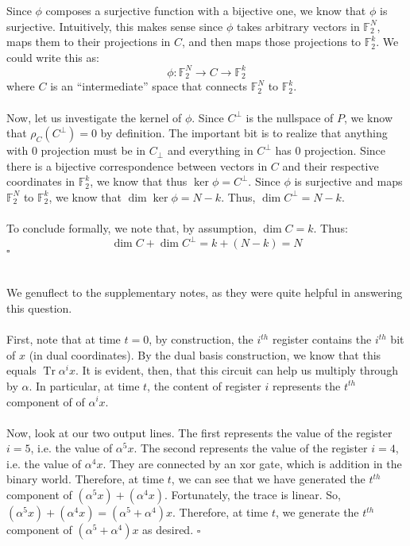 \documentclass[letterpaper]{article}
\newcommand*{\QED}{\hfill\ensuremath{\square}}%
\DeclareMathOperator{\tr}{Tr}
\begin{document}
Since $ \phi $ composes a surjective function with a bijective one, we know that $ \phi $ is surjective.
Intuitively, this makes sense since $ \phi $ takes arbitrary vectors in $ \mathbb{F}_2^N $, maps them to their projections in $ C $, and then maps those projections to $ \mathbb{F}_2^k $.
We could write this as:
\[
\phi : \mathbb{F}_2^N \to C \to \mathbb{F}_2^k
\]
where $ C $ is an ``intermediate'' space that connects $ \mathbb{F}_2^N $ to $ \mathbb{F}_2^k $.
\\ \\
Now, let us investigate the kernel of $ \phi $.
Since $ C^{\perp} $ is the nullspace of $ P $, we know that $ \rho_C(C^{\perp}) = 0 $ by definition.
The important bit is to realize that anything with $ 0 $ projection must be in $ C_{\perp} $ and everything in $ C^{\perp} $ has $ 0 $ projection.
Since there is a bijective correspondence between vectors in $ C $ and their respective coordinates in $ \mathbb{F}_2^k $, we know that thus $ \ker{\phi} = C^{\perp} $.
Since $ \phi $ is surjective and maps $ \mathbb{F}_2^N $ to $ \mathbb{F}_2^k $, we know that $ \dim{\ker{\phi}} = N - k $.
Thus, $ \dim{C^{\perp}} = N - k $.
\\ \\
To conclude formally, we note that, by assumption, $ \dim{C} = k $.
Thus:
\[
\dim{C} + \dim{C^{\perp}} = k + (N - k) = N
\]
\QED{}

\section{}
\label{sec:Question3}

We genuflect to the supplementary notes, as they were quite helpful in answering this question.
\\ \\
First, note that at time $ t = 0 $, by construction, the $ i^{th} $ register contains the $ i^{th} $ bit of $ x $ (in dual coordinates).
By the dual basis construction, we know that this equals $ \tr{\alpha^i x} $.
It is evident, then, that this circuit can help us multiply through by $ \alpha $.
In particular, at time $ t $, the content of register $ i $ represents the $ t^{th} $ component of of $ \alpha^{i} x $.
\\ \\
Now, look at our two output lines.
The first represents the value of the register $ i = 5 $, i.e.
 the value of $ \alpha^5 x $.
The second represents the value of the register $ i = 4 $, i.e.
 the value of $ \alpha^4 x $.
They are connected by an xor gate, which is addition in the binary world.
Therefore, at time $ t $, we can see that we have generated the $ t^{th} $ component of $ (\alpha^5 x) + (\alpha^4 x) $.
Fortunately, the trace is linear.
So, $ (\alpha^5 x) + (\alpha^4 x) = (\alpha^5 + \alpha^4)x $.
Therefore, at time $ t $, we generate the $ t^{th} $ component of $ (\alpha^5 + \alpha^4)x $ as desired.
\QED{}
\end{document}
